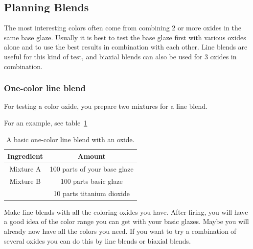\subsection{Planning Blends}
The most interesting colors often come from combining 2 or more oxides in the 
same base glaze. Usually it is best to test the base glaze first with various 
oxides alone and to use the best results in combination with each other. Line 
blends are useful for this kind of test, and biaxial blends can also be used 
for 3 oxides in combination.
\subsubsection{One-color line blend}
For testing a color oxide, you prepare two mixtures for a line blend.

For an example, see table~\ref{tab:lineblendone}
\begin{center}
  \renewcommand{\arraystretch}{1.5}
  \begin{table}\centering
    \begin{tabular}{|c|c|}\hline
      \textbf{Ingredient}&\textbf{Amount}\\\hline\hline
      Mixture A&100 parts of your base glaze\\\hline
Mixture B&100 parts basic glaze\\\cline{2-2}
&10 parts titanium dioxide\\\hline
    \end{tabular}
\caption{A basic one-color line blend with an oxide.}
\label{tab:lineblendone}
\end{table}
\end{center}
Make line blends with all the coloring oxides you have. After firing, you will 
have a good idea of the color range you can get with your basic glazes. Maybe 
you will already now have all the colors you need. If you want to try a 
combination of several oxides you can do this by line blends or biaxial blends.
